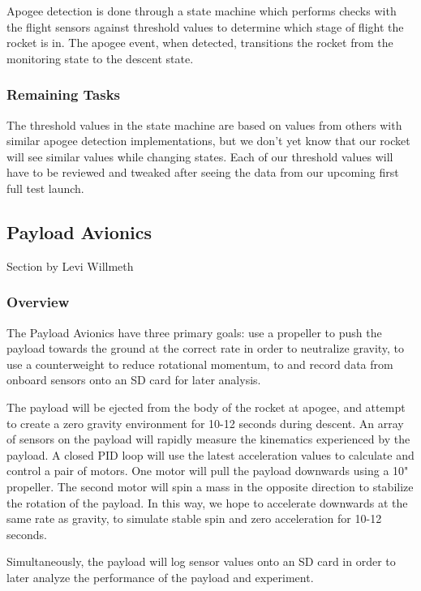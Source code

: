 \documentclass[onecolumn, draftclsnofoot, 10pt, compsoc]{IEEEtran}
\begin{document}
Apogee detection is done through a state machine which performs checks with the flight sensors against threshold values to determine which stage of flight the rocket is in. The apogee event, when detected, transitions the rocket from the monitoring state to the descent state. 


\subsubsection{Remaining Tasks}
The threshold values in the state machine are based on values from others with similar apogee detection implementations, but we don't yet know that our rocket will see similar values while changing states. 
Each of our threshold values will have to be reviewed and tweaked after seeing the data from our upcoming first full test launch.



\subsection{Payload Avionics}
Section by Levi Willmeth

\subsubsection{Overview}
The Payload Avionics have three primary goals: use a propeller to push the payload towards the ground at the correct rate in order to neutralize gravity, to use a counterweight to reduce rotational momentum, to and record data from onboard sensors onto an SD card for later analysis.

The payload will be ejected from the body of the rocket at apogee, and attempt to create a zero gravity environment for 10-12 seconds during descent.  An array of sensors on the payload will rapidly measure the kinematics experienced by the payload.  A closed PID loop will use the latest acceleration values to calculate and control a pair of motors.  One motor will pull the payload downwards using a 10" propeller.  The second motor will spin a mass in the opposite direction to stabilize the rotation of the payload.  In this way, we hope to accelerate downwards at the same rate as gravity, to simulate stable spin and zero acceleration for 10-12 seconds.

Simultaneously, the payload will log sensor values onto an SD card in order to later analyze the performance of the payload and experiment.
\end{document}
